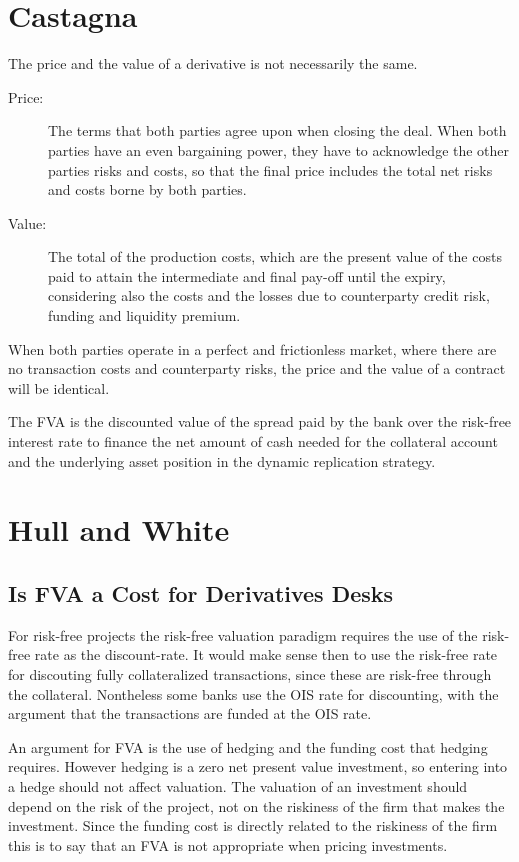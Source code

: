 \documentclass[10pt,a4paper]{article}
\begin{document}
     \section{Castagna}
        The price and the value of a derivative is not necessarily the same.

        \begin{description}
            \item[Price:] The terms that both parties agree upon when closing the deal. When both parties have an even bargaining power, they have to acknowledge the other parties risks and costs, so that the final price includes the total net risks and costs borne by both parties.
            \item[Value:] The total of the production costs, which are the present value of the costs paid to attain the intermediate and final pay-off until the expiry, considering also the costs and the losses due to counterparty credit risk, funding and liquidity premium.
        \end{description}

        When both parties operate in a perfect and frictionless market, where there are no transaction costs and counterparty risks, the price and the value of a contract will be identical.

        The FVA is the discounted value of the spread paid by the bank over the risk-free interest rate to finance the net amount of cash needed for the collateral account and the underlying asset position in the dynamic replication strategy.

    \section{Hull and White}
    \subsection{Is FVA a Cost for Derivatives Desks}
        For risk-free projects the risk-free valuation paradigm requires the use of the risk-free rate as the discount-rate. It would make sense then to use the risk-free rate for discouting fully collateralized transactions, since these are risk-free through the collateral. Nontheless some banks use the OIS rate for discounting, with the argument that the transactions are funded at the OIS rate. 

        An argument for FVA is the use of hedging and the funding cost that hedging requires. However hedging is a zero net present value investment, so entering into a hedge should not affect valuation. The valuation of an investment should depend on the risk of the project, not on the riskiness of the firm that makes the investment. Since the funding cost is directly related to the riskiness of the firm this is to say that an FVA is not appropriate when pricing investments. 
\end{document}
